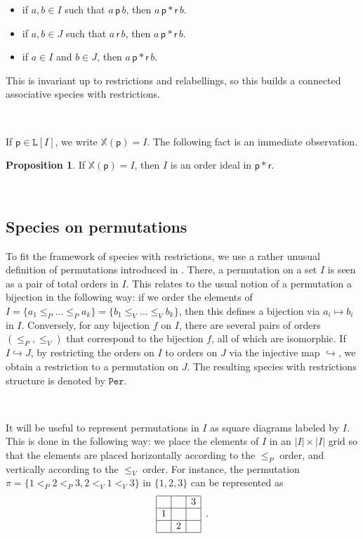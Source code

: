 \documentclass[12pt, reqno]{amsart}
\theoremstyle{definition}
\newtheorem{prop}[thm]{Proposition}
\begin{document}
\begin{itemize}
\item if $a, b \in I$ such that $a \, \mathsf{p} \, b$, then $a \, \mathsf{p} \ast \mathsf{r} \, b$.

\item if $a, b \in J$ such that $a \, \mathsf{r} \, b$, then $a \, \mathsf{p} \ast \mathsf{r} \, b$.

\item if $a \in I$ and $b \in J$, then $a \, \mathsf{p} \ast \mathsf{r} \, b$.
\end{itemize}
This is invariant up to restrictions and relabellings, so this builds a connected associative species with restrictions. 

\

If $\mathsf{p} \in \mathtt{L}[I]$, we write $\mathbb{X}(\mathsf{p}) = I$.
The following fact is an immediate observation.

\begin{prop}\label{prop:linorderideals}
If $\mathbb{X}(\mathsf{p}) = I$, then $I$ is an order ideal in $\mathsf{p} \ast \mathsf{r}$.
\end{prop}

\

\subsection{Species on permutations\label{sec:speciespermutation}}

To fit the framework of species with restrictions, we use a rather unusual definition of permutations introduced in \cite{albert2020two}.
There, a permutation on a set $I$ is seen as a pair of total orders in $I$.
This relates to the usual notion of a permutation a bijection in the following way: if we order the elements of $I = \{a_1 \leq_P \dots \leq_P a_k \} = \{ b_1 \leq_V \dots \leq_V b_k \}$, then this defines a bijection via $a_i \mapsto b_i $ in $I$.
Conversely, for any bijection $f$ on $I$, there are several pairs of orders $(\leq_P, \leq_V)$ that correspond to the bijection $f$, all of which are isomorphic.
If $I \hookrightarrow J$, by restricting the orders on $I$ to orders on $J$ via the injective map $\hookrightarrow $, we obtain a restriction to a permutation on $J$.
The resulting species with restrictions structure is denoted by $\mathtt{Per}$.

\

It will be useful to represent permutations in $I$ as square diagrams labeled by $I$.
This is done in the following way: we place the elements of $I$ in an $|I| \times |I|$ grid so that the elements are placed horizontally according to the $\leq_P$ order, and vertically according to the $\leq_V$ order.
For instance, the permutation $\pi = \{1<_P2<_P3 , 2<_V1<_V3\}$ in $\{1, 2, 3\}$ can be represented as 
\begin{equation}
\begin{array}{|c|c|c|}
	\hline & & 3 \\
    \hline 1 & &  \\
    \hline & 2 & \\
    \hline 
\end{array}\, \, \, .
\end{equation}
\end{document}
